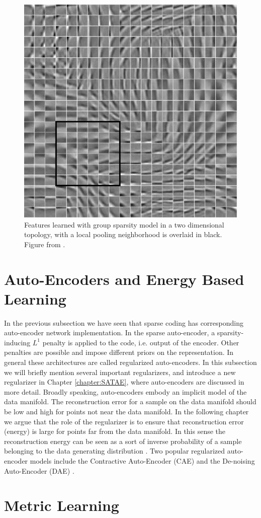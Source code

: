 \begin{figure} 
\centering
\includegraphics[scale=0.4]{./figures/related_work/PSD.png} 
\caption{Features learned with group sparsity model in a two dimensional topology, 
with a local pooling neighborhood is overlaid in black. Figure from \cite{groupSparsity}.}
\label{fig:GSC_features} 
\end{figure} 
 
\section{Auto-Encoders and Energy Based Learning} 
In the previous subsection we have seen that sparse coding has corresponding
auto-encoder network implementation. In the sparse auto-encoder, a
sparsity-inducing $L^1$ penalty is applied to the code, i.e. output of the
encoder. Other penalties are possible and impose different priors on the
representation. In general these architectures are called regularized
auto-encoders. In this subsection we will briefly mention several important
regularizers, and introduce a new regularizer in Chapter \ref{chapter:SATAE},
where auto-encoders are discussed in more detail. Broadly speaking,
auto-encoders embody an implicit model of the data manifold. The reconstruction
error for a sample on the data manifold should be low and high for points not
near the data manifold.  In the following chapter we argue that the role of the
regularizer is to ensure that reconstruction error (energy) is large for points
far from the data manifold. In this sense the reconstruction energy can be seen
as a sort of inverse probability of a sample belonging to the data generating
distribution \cite{lecun2006}. Two popular regularized auto-encoder models
include the Contractive Auto-Encoder (CAE) and the De-noising Auto-Encoder
(DAE) \cite{CAE,DAE}.    


\section{Metric Learning}

 

